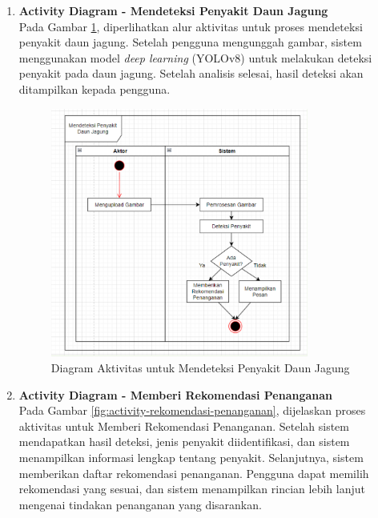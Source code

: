\documentclass[journal,article,submit,pdftex,moreauthors]{Definitions/mdpi}
\begin{document}
\begin{enumerate}[label=\alph*)]
    \item \textbf{Activity Diagram - Mendeteksi Penyakit Daun Jagung} \\
    Pada Gambar \ref{fig:activity-detect-disease}, diperlihatkan alur aktivitas untuk proses mendeteksi penyakit daun jagung. Setelah pengguna mengunggah gambar, sistem menggunakan model \textit{deep learning} (YOLOv8) untuk melakukan deteksi penyakit pada daun jagung. Setelah analisis selesai, hasil deteksi akan ditampilkan kepada pengguna.

    \begin{figure}[H]
        \centering
        \includegraphics[width=0.8\textwidth]{Images/activity_detect.png}
        \caption{\centering Diagram Aktivitas untuk Mendeteksi Penyakit Daun Jagung}
        \label{fig:activity-detect-disease}
    \end{figure}
    
    \item \textbf{Activity Diagram - Memberi Rekomendasi Penanganan} \\
    Pada Gambar \ref{fig:activity-rekomendasi-penanganan}, dijelaskan proses aktivitas untuk Memberi Rekomendasi Penanganan. Setelah sistem mendapatkan hasil deteksi, jenis penyakit diidentifikasi, dan sistem menampilkan informasi lengkap tentang penyakit. Selanjutnya, sistem memberikan daftar rekomendasi penanganan. Pengguna dapat memilih rekomendasi yang sesuai, dan sistem menampilkan rincian lebih lanjut mengenai tindakan penanganan yang disarankan.
    

\end{enumerate}
\end{document}

